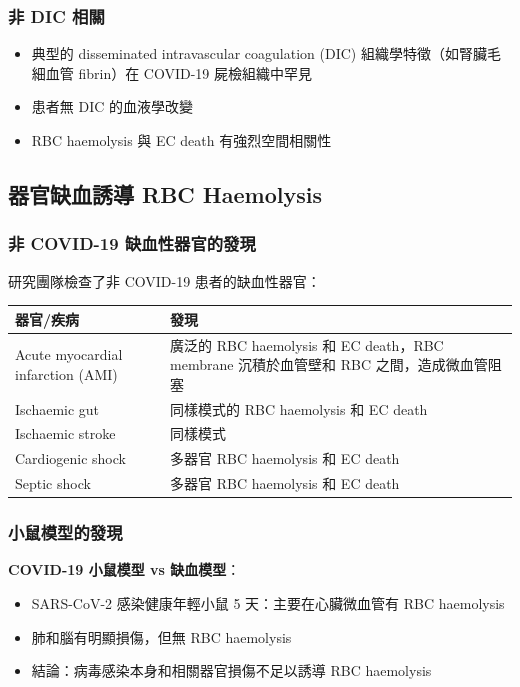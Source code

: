 \documentclass[12pt,a4paper]{article}
\begin{document}
\subsubsection{非 DIC 相關}

\begin{itemize}
    \item 典型的 disseminated intravascular coagulation (DIC) 組織學特徵（如腎臟毛細血管 fibrin）在 COVID-19 屍檢組織中罕見
    \item 患者無 DIC 的血液學改變
    \item RBC haemolysis 與 EC death 有強烈空間相關性
\end{itemize}


\subsection{器官缺血誘導 RBC Haemolysis}

\subsubsection{非 COVID-19 缺血性器官的發現}

研究團隊檢查了非 COVID-19 患者的缺血性器官：

\begin{longtable}{p{4cm}p{10cm}}
\toprule
\textbf{器官/疾病} & \textbf{發現} \\
\midrule
\endhead
Acute myocardial infarction (AMI) & 廣泛的 RBC haemolysis 和 EC death，RBC membrane 沉積於血管壁和 RBC 之間，造成微血管阻塞 \\
Ischaemic gut & 同樣模式的 RBC haemolysis 和 EC death \\
Ischaemic stroke & 同樣模式 \\
Cardiogenic shock & 多器官 RBC haemolysis 和 EC death \\
Septic shock & 多器官 RBC haemolysis 和 EC death \\
\bottomrule
\end{longtable}

\subsubsection{小鼠模型的發現}

\textbf{COVID-19 小鼠模型 vs 缺血模型}：
\begin{itemize}
    \item SARS-CoV-2 感染健康年輕小鼠 5 天：主要在心臟微血管有 RBC haemolysis
    \item 肺和腦有明顯損傷，但無 RBC haemolysis
    \item 結論：病毒感染本身和相關器官損傷不足以誘導 RBC haemolysis
\end{itemize}
\end{document}
